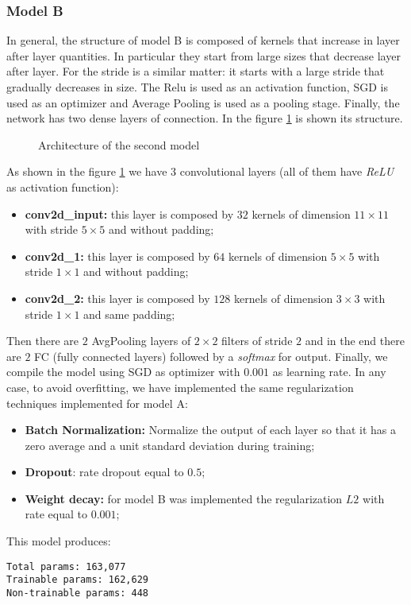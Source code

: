 \subsubsection{Model B}
In general, the structure of model B is composed of kernels that increase in layer after layer quantities. In particular they start from large sizes that decrease layer after layer. For the stride is a similar matter: it starts with a large stride that gradually decreases in size. The Relu is used as an activation function,  SGD is used as an optimizer and Average Pooling is used as a pooling stage. Finally, the network has two dense layers of connection. In the figure \ref{fig:modB} is shown its structure.
\begin{figure}[h!]
    \modB
    \caption{Architecture of the second model}
    \label{fig:modB}
\end{figure}
As shown in the figure \ref{fig:modB} we have $3$ convolutional layers (all of them have \textit{ReLU} as activation function):
\begin{itemize}
\item{\textbf{conv2d\_input:} this layer is composed by $32$ kernels of dimension $11 \times 11$ with stride $5 \times 5$ and without padding;}
\item{\textbf{conv2d\_1:} this layer is composed by $64$ kernels of dimension $5 \times 5$ with stride $1 \times 1$ and without padding;}
\item{\textbf{conv2d\_2:} this layer is composed by $128$ kernels of dimension $3 \times 3$ with stride $1 \times 1$ and same padding;}
\end{itemize}
Then there are $2$ AvgPooling layers of $2 \times 2$ filters of stride $2$ and in the end there are $2$ FC (fully connected layers) followed
by a \textit{softmax} for output. Finally, we compile the model using SGD as optimizer with $0.001$ as learning rate.
In any case, to avoid overfitting, we have implemented the same regularization techniques implemented for model A:
\begin{itemize}
\item{\textbf{Batch Normalization:} Normalize the output of each layer so that it has a zero average and a unit standard deviation during training;}
\item{\textbf{Dropout}: rate dropout equal to $0.5$;}
\item{\textbf{Weight decay:} for model B was implemented the regularization $L2$ with rate equal to $0.001$;}
\end{itemize}
This model produces:
\begin{verbatim}
Total params: 163,077
Trainable params: 162,629
Non-trainable params: 448
\end{verbatim}